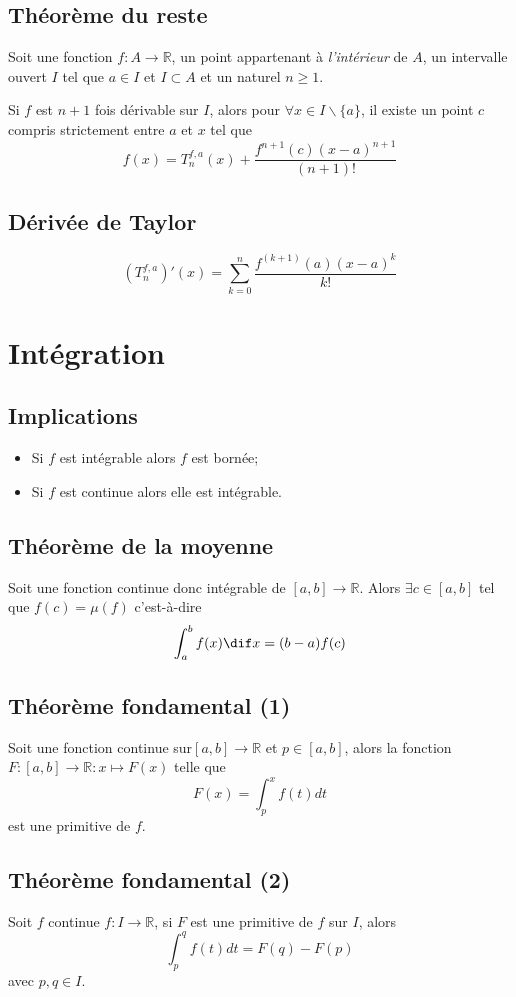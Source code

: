 \subsection{Théorème du reste}
Soit une fonction $f : A \rightarrow \mathbb{R}$,
un point appartenant à \emph{l'intérieur} de $A$,
un intervalle ouvert $I$ tel que $a \in I$ et $I\subset A$
et un naturel $n \geq 1$.

Si $f$ est $n + 1$ fois dérivable sur $I$,
alors pour $\forall x \in I \backslash \{a\}$,
il existe un point $c$ compris strictement entre $a$ et $x$ tel que
\[ f(x) = T_n^{f,a}(x) + \frac{f^{n+1}(c)(x - a)^{n+1}}{(n + 1)!} \]

\subsection{Dérivée de Taylor}
\[ \left(T_n^{f,a}\right)'(x) =
\sum_{k = 0}^n \frac{f^{(k+1)}(a)(x - a)^{k}}{k!} \]

\section{Intégration}
\subsection{Implications}
\begin{itemize}
  \item Si $f$ est intégrable alors $f$ est bornée;
  \item Si $f$ est continue alors elle est intégrable.
\end{itemize}

\subsection{Théorème de la moyenne}
Soit une fonction continue donc intégrable de $[a,b] \rightarrow \mathbb{R}$.
Alors $\exists c \in [a,b]$ tel que $f(c) = \mu{(f)}$ c'est-à-dire
\[ \int_a^b f(x) \dif x = (b - a)f(c) \]

\subsection{Théorème fondamental (1)}
Soit une fonction continue sur$[a,b] \to \mathbb{R}$ et $p \in [a,b]$,
alors la fonction $F : [a,b] \to \mathbb{R} : x \mapsto F(x)$
telle que
\[ F(x) = \int_p^x f(t) dt \]
est une primitive de $f$.

\subsection{Théorème fondamental (2)}
Soit $f$ continue $f : I \to \mathbb{R}$,
si $F$ est une primitive de $f$ sur $I$, alors
\[ \int_p^q f(t) dt = F(q) - F(p) \]
avec $p, q \in I$.

